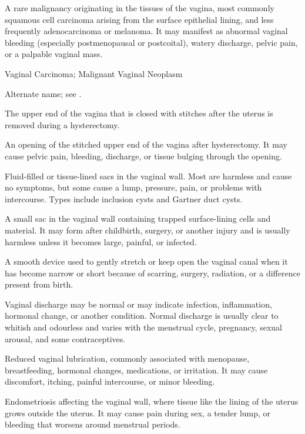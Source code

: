  A rare malignancy originating in the tissues of the vagina, most commonly squamous cell carcinoma arising from the surface epithelial lining, and less frequently adenocarcinoma or melanoma. It may manifest as abnormal vaginal bleeding (especially postmenopausal or postcoital), watery discharge, pelvic pain, or a palpable vaginal mass.

\synonyms
Vaginal Carcinoma; Malignant Vaginal Neoplasm

 Alternate name; see .

 The upper end of the vagina that is closed with stitches after the uterus is removed during a hysterectomy.

 An opening of the stitched upper end of the vagina after hysterectomy. It may cause pelvic pain, bleeding, discharge, or tissue bulging through the opening.

 Fluid-filled or tissue-lined sacs in the vaginal wall. Most are harmless and cause no symptoms, but some cause a lump, pressure, pain, or problems with intercourse. Types include inclusion cysts and Gartner duct cysts.

 A small sac in the vaginal wall containing trapped surface-lining cells and material. It may form after childbirth, surgery, or another injury and is usually harmless unless it becomes large, painful, or infected.

 A smooth device used to gently stretch or keep open the vaginal canal when it has become narrow or short because of scarring, surgery, radiation, or a difference present from birth.

 Vaginal discharge may be normal or may indicate infection, inflammation, hormonal change, or another condition. Normal discharge is usually clear to whitish and odourless and varies with the menstrual cycle, pregnancy, sexual arousal, and some contraceptives.

 Reduced vaginal lubrication, commonly associated with menopause, breastfeeding, hormonal
changes, medications, or irritation. It may cause discomfort, itching, painful
intercourse, or minor bleeding.

 Endometriosis affecting the vaginal wall, where tissue like the lining of the uterus grows outside the uterus. It may cause pain during sex, a tender lump, or bleeding that worsens around menstrual periods.

